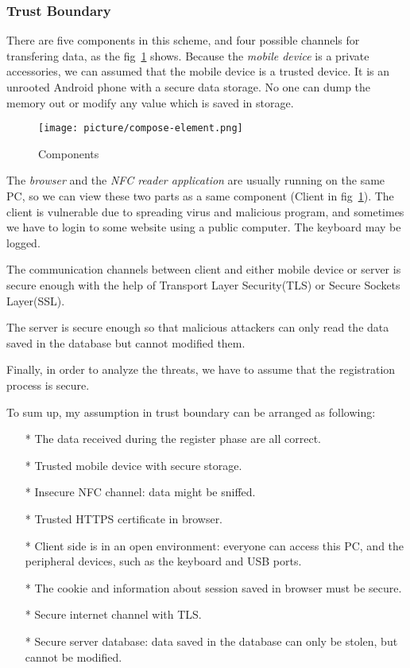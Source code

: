 \begin{CJK}{Bg5}{bsmi}
\subsubsection{Trust Boundary}

There are five components in this scheme, and four possible channels for transfering data, as the fig~\ref{fig:compose-element} shows. Because the \emph{mobile device} is a private accessories, we can assumed that the mobile device is a trusted device. It is an unrooted Android phone with a secure data storage. No one can dump the memory out or modify any value which is saved in storage.

\begin{figure}
\centering
\texttt{[image: picture/compose-element.png]}
\caption{Components}
\label{fig:compose-element}
\end{figure}

The \emph{browser} and the \emph{NFC reader application} are usually running on the same PC, so we can view these two parts as a same component (Client in fig~\ref{fig:compose-element}). The client is vulnerable due to spreading virus and malicious program, and sometimes we have to login to some website using a public computer. The keyboard may be logged. 

The communication channels between client and either mobile device or server is secure enough with the help of Transport Layer Security(TLS) or Secure Sockets Layer(SSL). 

The server is secure enough so that malicious attackers can only read the data saved in the database but cannot modified them.

Finally, in order to analyze the threats, we have to assume that the registration process is secure. 

To sum up, my assumption in trust boundary can be arranged as following:
\begin{enumerate}
\item[*] The data received during the register phase are all correct.
\item[*] Trusted mobile device with secure storage.
\item[*] Insecure NFC channel: data might be sniffed.
\item[*] Trusted HTTPS certificate in browser.
\item[*] Client side is in an open environment: everyone can access this PC, and the peripheral devices, such as the keyboard and USB ports.
\item[*] The cookie and information about session saved in browser must be secure.
\item[*] Secure internet channel with TLS.
\item[*] Secure server database: data saved in the database can only be stolen, but cannot be modified.
\end{enumerate}


\end{CJK}
